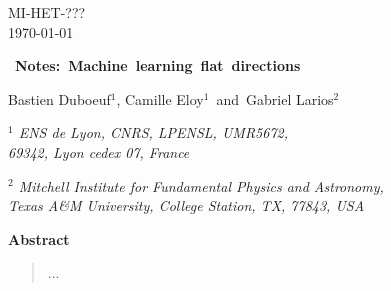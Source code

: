 \documentclass[11pt]{article}
\begin{document}
\begin{titlepage}



\begin{flushright}

MI-HET-??? \\
\today
\end{flushright}


\vspace{25pt}

   
   \begin{center}
   \baselineskip=16pt


   \begin{Large}

\mbox{ \bfseries \boldmath  Notes: Machine learning flat directions}
   \end{Large}


   		
\vspace{25pt}
		

{\large  Bastien Duboeuf$^{1}$, Camille Eloy$^{1}$ \,and\, Gabriel Larios$^{2}$}
		
\vspace{25pt}
		
		
	\begin{small}

	{\it $^{1}$ ENS de Lyon, CNRS, LPENSL, UMR5672,\\ 69342, Lyon cedex 07, France}  \\


	\vspace{10pt}
	
	{\it $^{2}$ Mitchell Institute for Fundamental Physics and Astronomy, \\
	Texas A\&M University, College Station, TX, 77843, USA}     \\
		
	\end{small}
		

\vskip 50pt

\end{center}


\begin{center}
\textbf{Abstract}
\end{center}


\begin{quote}

...

\end{quote}

\vfill

\end{titlepage}
\end{document}
